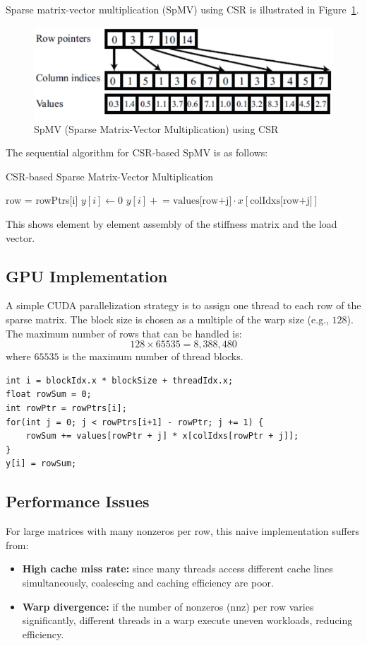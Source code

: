 \documentclass[12pt]{book}
\begin{document}
Sparse matrix-vector multiplication (SpMV) using CSR is illustrated in Figure~\ref{fig:SpMV}. 

\begin{figure}[H]
    \centering
    \includegraphics[width=0.55\linewidth]{images/CSRSpMV.png}
    \caption{SpMV (Sparse Matrix-Vector Multiplication) using CSR}
    \label{fig:SpMV}
\end{figure}

The sequential algorithm for CSR-based SpMV is as follows:
\begin{algorithm}[H]
\caption{CSR-based Sparse Matrix-Vector Multiplication}
\label{alg:csr_spmv}
\begin{algorithmic}[1]
    \State row = rowPtrs[i]
    \State $y[i] \gets 0$
        \State $y[i] \mathrel{+}= \text{values[row+j]} \cdot x[\text{colIdxs[row+j]}]$
    \EndFor
\EndFor
\end{algorithmic}
\end{algorithm}
This shows element by element assembly of the stiffness matrix and the load vector.
\subsection*{GPU Implementation}
A simple CUDA parallelization strategy is to assign one thread to each row of the sparse matrix. The block size is chosen as a multiple of the warp size (e.g., $128$). The maximum number of rows that can be handled is:
\[
128 \times 65535 = 8,388,480
\]
where $65535$ is the maximum number of thread blocks.

\begin{lstlisting}[style=cppstyle]
int i = blockIdx.x * blockSize + threadIdx.x;
float rowSum = 0;
int rowPtr = rowPtrs[i];
for(int j = 0; j < rowPtrs[i+1] - rowPtr; j += 1) {
    rowSum += values[rowPtr + j] * x[colIdxs[rowPtr + j]];
}
y[i] = rowSum;
\end{lstlisting}

\subsection*{Performance Issues}
For large matrices with many nonzeros per row, this naive implementation suffers from:
\begin{itemize}
    \item \textbf{High cache miss rate:} since many threads access different cache lines simultaneously, coalescing and caching efficiency are poor.
    \item \textbf{Warp divergence:} if the number of nonzeros (nnz) per row varies significantly, different threads in a warp execute uneven workloads, reducing efficiency.
\end{itemize}
\end{document}
